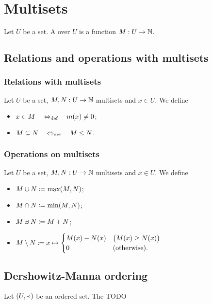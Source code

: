\section{Multisets}
\begin{definition}
Let $U$ be a set. A  over $U$ is a function $M: U\to \mathbb{N}$.
\end{definition}

\subsection{Relations and operations with multisets}
\subsubsection{Relations with multisets}
\begin{definition}
Let $U$ be a set, $M,N: U\to \mathbb{N}$ multisets and $x\in U$. We define
\begin{itemize}
\item $x\in M \quad\Leftrightarrow_{\text{def}}\quad m(x) \neq 0$;
\item $M\subseteq N \quad\Leftrightarrow_{\text{def}}\quad M \leq N$.
\end{itemize}
\end{definition}

\subsubsection{Operations on multisets}
\begin{definition}
Let $U$ be a set, $M,N: U\to \mathbb{N}$ multisets and $x\in U$. We define
\begin{itemize}
\item $M\cup N \coloneqq \max(M,N)$;
\item $M\cap N \coloneqq \min(M,N)$;
\item $M\uplus N \coloneqq M+N$;
\item $M\setminus N \coloneqq x\mapsto\begin{cases}
M(x) - N(x) & \big(M(x) \geq N(x)\big) \\
0 & (\text{otherwise}).
\end{cases}$
\end{itemize}
\end{definition}

\subsection{Dershowitz-Manna ordering}
\begin{definition}
Let $\left( U,\Yleft \right)$ be an ordered set. The TODO
\end{definition}

